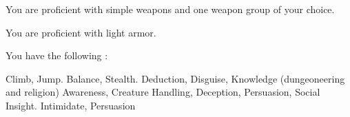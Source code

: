 You are proficient with simple weapons and one weapon group of your choice.

You are proficient with light armor.

You have the following :
\begin{itemize}
	 Climb, Jump.
	 Balance, Stealth.
	 Deduction, Disguise, Knowledge (dungeoneering and religion)
	 Awareness, Creature Handling, Deception, Persuasion, Social Insight.
	 Intimidate, Persuasion
\end{itemize}
